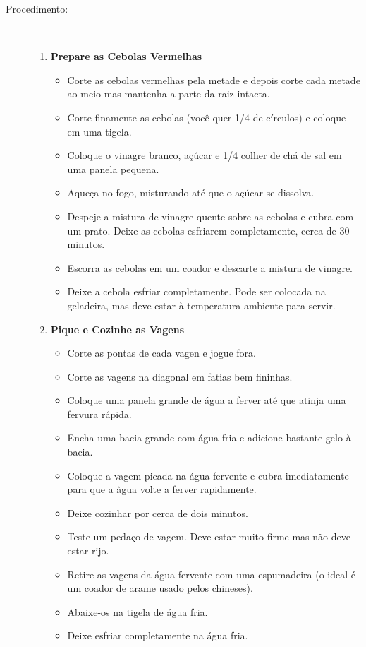 \documentclass [11pt, letterpaper] {article}
\begin{document}
\begin {description}
\item [Procedimento:] \ \\
\begin {enumerate}
\item {\bf Prepare as Cebolas Vermelhas}
\begin {itemize}
\item Corte as cebolas vermelhas pela metade e depois corte cada metade ao meio mas mantenha a parte da raiz intacta.
\item Corte finamente as cebolas (você quer 1/4 de círculos) e coloque em uma tigela.
\item Coloque o vinagre branco, açúcar e 1/4 colher de chá de sal em uma panela pequena.
\item Aque\c{c}a no fogo, misturando até que o açúcar se dissolva.
\item Despeje a mistura de vinagre quente sobre as cebolas e cubra com um prato. Deixe as cebolas esfriarem completamente, cerca de 30 minutos.
\item Escorra as cebolas em um coador e descarte a mistura de vinagre.
\item Deixe a cebola esfriar completamente. Pode ser colocada na geladeira, mas deve estar \`a temperatura ambiente para servir.
\end {itemize}
\item {\bf Pique e Cozinhe as Vagens}
\begin {itemize}
\item Corte as pontas de cada vagen e jogue fora.
\item Corte as vagens na diagonal em fatias bem fininhas. 
\item Coloque uma panela  grande de água a ferver at\'e que atinja uma fervura rápida.
\item Encha uma bacia grande com água fria e adicione bastante gelo à bacia.
\item Coloque a vagem picada na água fervente e cubra imediatamente para que a \`agua volte a ferver rapidamente.
\item Deixe cozinhar por cerca de dois minutos.
\item Teste um pedaço de vagem. Deve estar muito firme mas n\~ao deve estar rijo.
\item Retire as vagens da água fervente com uma espumadeira (o ideal \'e um coador de arame usado pelos chineses).
\item Abaixe-os na tigela de água fria.
\item Deixe esfriar completamente na água fria.
\end {itemize}

\end{enumerate}
\end{description}
\end{document}
